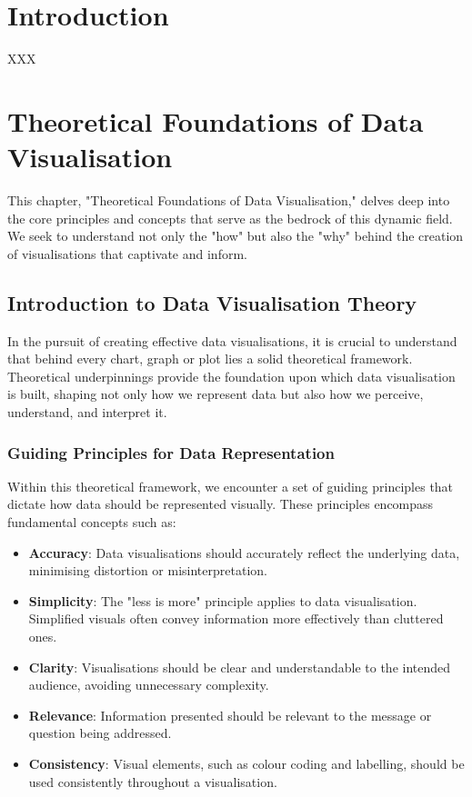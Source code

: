 \documentclass{article}\usepackage[]{graphicx}\usepackage[]{xcolor}
\begin{document}
\tableofcontents
\newpage 

\section{Introduction}
XXX
\newpage 


\section{Theoretical Foundations of Data Visualisation}
This chapter, "Theoretical Foundations of Data Visualisation," delves deep into the core principles and concepts that serve as the bedrock of this dynamic field. We seek to understand not only the "how" but also the "why" behind the creation of visualisations that captivate and inform.

\subsection{Introduction to Data Visualisation Theory}
In the pursuit of creating effective data visualisations, it is crucial to understand that behind every chart, graph or plot lies a solid theoretical framework. Theoretical underpinnings provide the foundation upon which data visualisation is built, shaping not only how we represent data but also how we perceive, understand, and interpret it. 

\subsubsection{Guiding Principles for Data Representation}
Within this theoretical framework, we encounter a set of guiding principles that dictate how data should be represented visually. These principles encompass fundamental concepts such as:
\begin{itemize}
    \item \textbf{Accuracy}: Data visualisations should accurately reflect the underlying data, minimising distortion or misinterpretation.
    \item \textbf{Simplicity}: The "less is more" principle applies to data visualisation. Simplified visuals often convey information more effectively than cluttered ones.
    \item \textbf{Clarity}: Visualisations should be clear and understandable to the intended audience, avoiding unnecessary complexity.
    \item \textbf{Relevance}: Information presented should be relevant to the message or question being addressed.
    \item \textbf{Consistency}: Visual elements, such as colour coding and labelling, should be used consistently throughout a visualisation.
\end{itemize}
\end{document}
